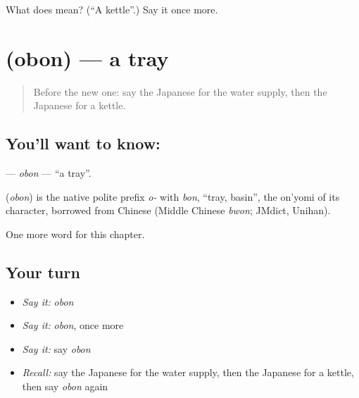 \begin{tcolorbox}[breakable,colback=teal!4,colframe=teal!35!black,title={Before you move on}]
What does  mean? (\textquotedblleft{}A kettle\textquotedblright{}.) Say it once more.
\end{tcolorbox}
\section[\texorpdfstring{\ja{おぼん} (obon)}{おぼん (obon)}]{ (obon) — a tray}

\label{lesson:JA-C103-obon}



\begin{quote}
Before the new one: say the Japanese for the water supply, then the Japanese for a kettle.
\end{quote}

\subsection*{You'll want to know: }
\textbf{} — \emph{obon} — \textquotedblleft{}a tray\textquotedblright{}.

\begin{cousinweb}
\textbf{} (\emph{obon}) is the native polite prefix \emph{o-} with \emph{bon}, \textquotedblleft{}tray, basin\textquotedblright{}, the on'yomi of its character, borrowed from Chinese (Middle Chinese \emph{bwon}; JMdict, Unihan).
\end{cousinweb}

\begin{grammarlens}[title={What you've built}]
One more word for this chapter.
\end{grammarlens}

\subsection*{Your turn}
\begin{itemize}
\raggedright
  \item \emph{Say it:} \emph{obon}
  \item \emph{Say it:} \emph{obon}, once more
  \item \emph{Say it:} say \emph{obon}
  \item \emph{Recall:} say the Japanese for the water supply, then the Japanese for a kettle, then say \emph{obon} again
\end{itemize}

